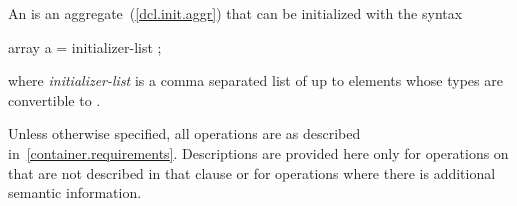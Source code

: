 \documentclass[american,twoside]{book}
\begin{document}
\pnum
{}%
%
An  is an aggregate~(\ref{dcl.init.aggr}) that can be
initialized with the syntax
\begin{codeblock}
array a = { initializer-list };
\end{codeblock}

where \textit{initializer-list} is a comma separated list of up
to  elements whose types are convertible to .

\pnum
{}%
Unless otherwise specified, all  operations are as described
in~\ref{container.requirements}. Descriptions are provided here
only for operations on  that are not described in that clause
or for operations where there is additional semantic information.
\end{document}
